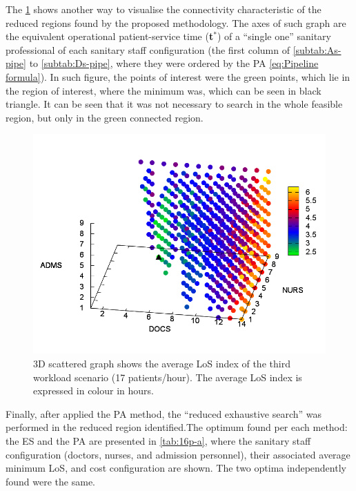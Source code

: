 \documentclass[11pt]{article} %
\begin{document}
The \ref{fig:3D-scattered-graph-100} shows another way to visualise
the connectivity characteristic of the reduced regions found by the
proposed methodology. The axes of such graph are the equivalent operational
patient-service time ({\bf t$^*$})  of a ``single
one'' sanitary professional of each sanitary staff configuration
(the first column of \ref{subtab:As-pipe} to \ref{subtab:Ds-pipe},
where they were ordered by the PA \ref{eq:Pipeline formula}). In
such figure, the points of interest were the green points, which lie
in the region of interest, where the minimum was, which can be seen
in black triangle. It can be seen that it was not necessary to search
in the whole feasible region, but only in the green connected region.
\begin{figure}[h]
\noindent \centering{}\includegraphics[width=0.88\columnwidth,height=0.2\paperheight]{figs4/v0/6400-602-100-3D-scatter-LoS2}
\caption{3D scattered graph shows the average LoS index of the third workload
scenario (17 patients/hour). The average LoS index is expressed in
colour in hours. \label{fig:3D-scattered-graph-100}}
\end{figure}

Finally, after applied the PA method, the \textquotedblleft{}reduced exhaustive search\textquotedblright{}
was performed in the reduced region identified.The optimum
found per each method: the ES and the PA are presented in \ref{tab:16p-a}, where the sanitary staff
configuration (doctors, nurses, and admission personnel), their associated
average minimum LoS, and cost configuration are shown. The two optima
independently found were the same. 
\end{document}
